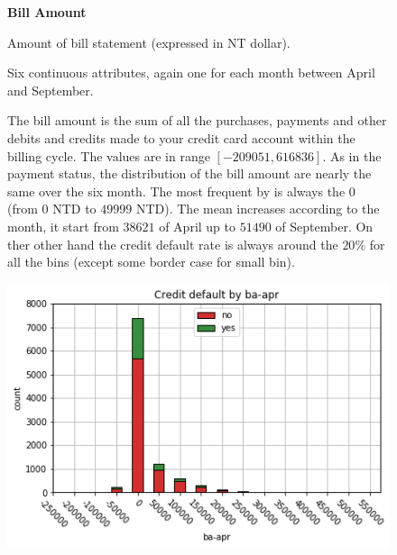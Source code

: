 \smallskip
\begin{figure}[h]
  \begin{minipage}[h]{.50\textwidth}
        {\Large \textbf{Bill Amount}}
        
        Amount of bill statement (expressed in NT dollar).
        
        Six continuous attributes, again one for each month between April and September.
        
        The bill amount is the sum of all the purchases, payments and other debits and credits made to your credit card account within the billing cycle. The values are in range $[-209051, 616836]$.
        As in the payment status, the distribution of the bill amount are nearly the same over the six month. The most frequent by is always the 0 (from $0$ NTD to $49999$ NTD).
        The mean increases according to the month, it start from $38621$ of April up to $51490$ of September. On ther other hand the credit default rate is always around the $20\%$ for all the bins (except some border case for small bin).
        
  \end{minipage}
  \begin{minipage}[h]{.50\textwidth}
    \includegraphics[width=.95\textwidth]{img/ch2/bill_amount_1}
  \end{minipage}
\end{figure}

